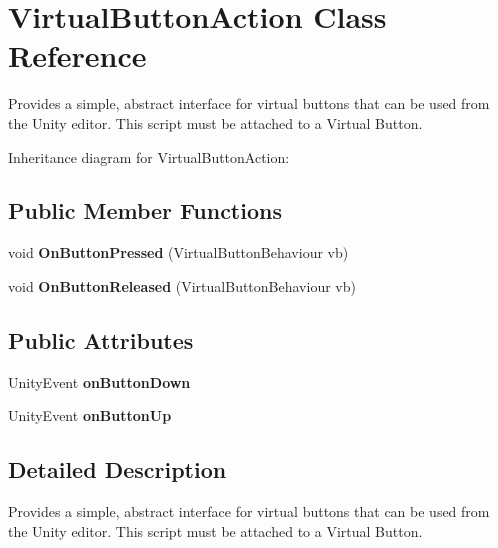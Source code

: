 \hypertarget{class_virtual_button_action}{}\section{Virtual\+Button\+Action Class Reference}
\label{class_virtual_button_action}


Provides a simple, abstract interface for virtual buttons that can be used from the Unity editor. This script must be attached to a Virtual Button.  


Inheritance diagram for Virtual\+Button\+Action\+:\begin{figure}[H]
\begin{center}
\leavevmode
\end{center}
\end{figure}
\subsection*{Public Member Functions}
\begin{DoxyCompactItemize}
\item 
\mbox{\label{class_virtual_button_action_aa97be4cd7a7e6c5af393384986e39f7b}} 
void {\bfseries On\+Button\+Pressed} (Virtual\+Button\+Behaviour vb)
\item 
\mbox{\label{class_virtual_button_action_ac49f68c1539ec61217060f5c7039b835}} 
void {\bfseries On\+Button\+Released} (Virtual\+Button\+Behaviour vb)
\end{DoxyCompactItemize}
\subsection*{Public Attributes}
\begin{DoxyCompactItemize}
\item 
\mbox{\label{class_virtual_button_action_a1ab91315e7924c607296243c53ef218b}} 
Unity\+Event {\bfseries on\+Button\+Down}
\item 
\mbox{\label{class_virtual_button_action_a70d10734052fa467df5329c2adb9d8b9}} 
Unity\+Event {\bfseries on\+Button\+Up}
\end{DoxyCompactItemize}


\subsection{Detailed Description}
Provides a simple, abstract interface for virtual buttons that can be used from the Unity editor. This script must be attached to a Virtual Button. 



